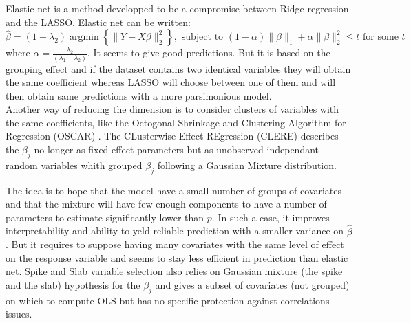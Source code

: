 \documentclass[11pt,a4paper]{article}
\begin{document}
	Elastic net\cite{zou2005regularization}	is a method developped to be a compromise between Ridge regression and the LASSO. 
	Elastic net can be written:
	\begin{equation}
		\hat{\beta}=(1+\lambda_2) \operatorname{argmin}\left\lbrace \parallel Y-X\beta \parallel_2^2 \right\rbrace, \textrm{ subject to } (1-\alpha)\parallel\beta\parallel_1+\alpha\parallel\beta\parallel_2^2\leq t \textrm{ for some } t
	\end{equation}
	where $\alpha=\frac{\lambda_2}{(\lambda_1+\lambda_2)}$. 
	It seems to give good predictions. But it is based on the grouping effect and if the dataset contains two identical variables they will obtain the same coefficient whereas LASSO will choose between one of them and will then obtain same predictions with a more parsimonious model. 
	\\
	
	Another way of reducing the dimension is to consider clusters of variables with the same coefficients, like the Octogonal Shrinkage and Clustering Algorithm for Regression (OSCAR) \cite{bondell2008simultaneous}.
	The CLusterwise Effect REgression\cite{yengo2012variable} (CLERE) describes the $\beta_j$ no longer as fixed effect parameters but as unobserved independant random variables whith grouped $\beta_j$ following a Gaussian Mixture distribution. 

The idea is to hope that the model have a small number of groups of covariates and that the mixture will have few enough components to have a number of parameters to estimate significantly lower than $p$. In such a case, it improves interpretability and ability to yeld reliable prediction with a smaller variance on $\hat{\beta}$. But it requires to suppose having many covariates with the same level of effect on the response variable and seems to stay less efficient in prediction than elastic net. Spike and Slab variable selection \cite{ishwaran2005spike} also relies on Gaussian mixture (the spike and the slab) hypothesis for the $\beta_j$ and gives a subset of covariates (not grouped) on which to compute OLS but has no specific protection against correlations issues.
	~\\	~\\
\end{document}
